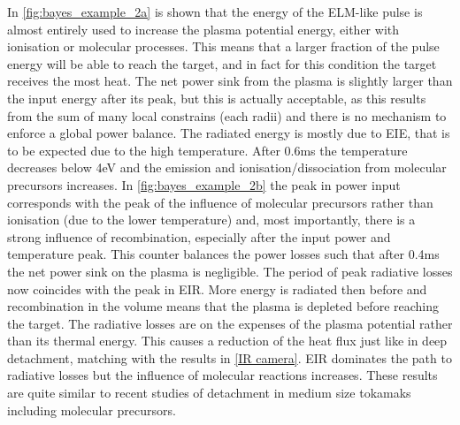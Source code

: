 In \autoref{fig:bayes_example_2a} is shown that the energy of the ELM-like pulse is almost entirely used to increase the plasma potential energy, either with ionisation or molecular processes. This means that a larger fraction of the pulse energy will be able to reach the target, and in fact for this condition the target receives the most heat. The net power sink from the plasma is slightly larger than the input energy after its peak, but this is actually acceptable, as this results from the sum of many local constrains (each radii) and there is no mechanism to enforce a global power balance. The radiated energy is mostly due to EIE, that is to be expected due to the high temperature. After 0.6ms the temperature decreases below 4eV and the emission and ionisation/dissociation from molecular precursors increases.
In \autoref{fig:bayes_example_2b} the peak in power input corresponds with the peak of the influence of molecular precursors rather than ionisation (due to the lower temperature) and, most importantly, there is a strong influence of recombination, especially after the input power and temperature peak. This counter balances the power losses such that after 0.4ms the net power sink on the plasma is negligible.\cite{Verhaegh2019} The period of peak radiative losses now coincides with the peak in EIR. More energy is radiated then before and recombination in the volume means that the plasma is depleted before reaching the target. The radiative losses are on the expenses of the plasma potential rather than its thermal energy. This causes a reduction of the heat flux just like in deep detachment, matching with the results in \autoref{IR camera}. EIR dominates the path to radiative losses but the influence of molecular reactions increases.
These results are quite similar to recent studies of detachment in medium size tokamaks including molecular precursors.\cite{Verhaegh2022,Verhaegh2021}

